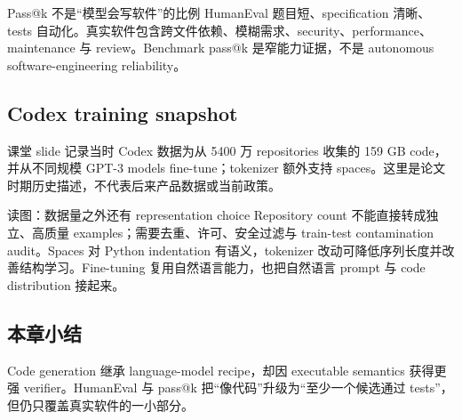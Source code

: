 \begin{warningbox}{Pass@k 不是“模型会写软件”的比例}
HumanEval 题目短、specification 清晰、tests 自动化。真实软件包含跨文件依赖、模糊需求、security、performance、maintenance 与 review。Benchmark pass@k 是窄能力证据，不是 autonomous software-engineering reliability。
\end{warningbox}

\subsection{Codex training snapshot}

课堂 slide 记录当时 Codex 数据为从 5400 万 repositories 收集的 159 GB code，并从不同规模 GPT-3 models fine-tune；tokenizer 额外支持 spaces。这里是论文时期历史描述，不代表后来产品数据或当前政策。


\begin{knowledgebox}{读图：数据量之外还有 representation choice}
Repository count 不能直接转成独立、高质量 examples；需要去重、许可、安全过滤与 train-test contamination audit。Spaces 对 Python indentation 有语义，tokenizer 改动可降低序列长度并改善结构学习。Fine-tuning 复用自然语言能力，也把自然语言 prompt 与 code distribution 接起来。
\end{knowledgebox}

\subsection{本章小结}

Code generation 继承 language-model recipe，却因 executable semantics 获得更强 verifier。HumanEval 与 pass@k 把“像代码”升级为“至少一个候选通过 tests”，但仍只覆盖真实软件的一小部分。

